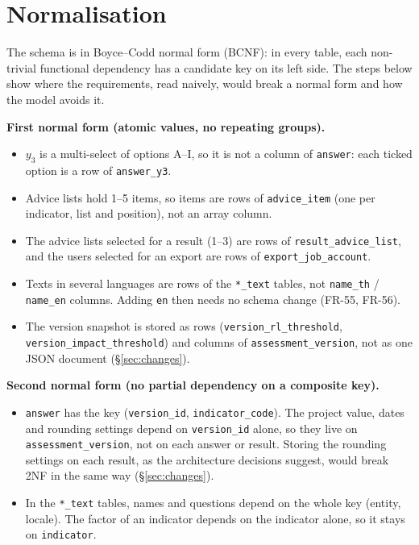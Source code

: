 \documentclass[11pt,a4paper]{article}
\newcommand{\tb}[1]{\texttt{#1}}
\begin{document}
\needspace{0.5\textheight}\section{Normalisation}

The schema is in Boyce–Codd normal form (BCNF): in every table, each non-trivial functional dependency has a candidate key on its left side. The steps below show where the requirements, read naively, would break a normal form and how the model avoids it.

\noindent\textbf{First normal form (atomic values, no repeating groups).}
\begin{itemize}
\item $y_3$ is a multi-select of options A--I, so it is not a column of \tb{answer}: each ticked option is a row of \tb{answer\_y3}.
\item Advice lists hold 1--5 items, so items are rows of \tb{advice\_item} (one per indicator, list and position), not an array column.
\item The advice lists selected for a result (1--3) are rows of \tb{result\_advice\_list}, and the users selected for an export are rows of \tb{export\_job\_account}.
\item Texts in several languages are rows of the \tb{*\_text} tables, not \tb{name\_th} / \tb{name\_en} columns. Adding \tb{en} then needs no schema change (FR-55, FR-56).
\item The version snapshot is stored as rows (\tb{version\_rl\_threshold}, \tb{version\_impact\_threshold}) and columns of \tb{assessment\_version}, not as one JSON document (\S\ref{sec:changes}).
\end{itemize}

\noindent\textbf{Second normal form (no partial dependency on a composite key).}
\begin{itemize}
\item \tb{answer} has the key (\tb{version\_id}, \tb{indicator\_code}). The project value, dates and rounding settings depend on \tb{version\_id} alone, so they live on \tb{assessment\_version}, not on each answer or result. Storing the rounding settings on each result, as the architecture decisions suggest, would break 2NF in the same way (\S\ref{sec:changes}).
\item In the \tb{*\_text} tables, names and questions depend on the whole key (entity, locale). The factor of an indicator depends on the indicator alone, so it stays on \tb{indicator}.
\end{itemize}
\end{document}

